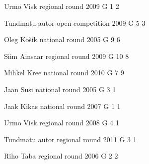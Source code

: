 \documentclass[11pt]{article}
\begin{document}
\ylDisplay{} %
{Urmo Visk} %
{regional round} %
{2009} %
{G 1} %
{2} %
{

\ifEngSolution
\fi
}

\ylDisplay{} %
{Tundmatu autor} %
{open competition} %
{2009} %
{G 5} %
{3} %
{

\ifEngSolution
\fi
}

\ylDisplay{} %
{Oleg Košik} %
{national round} %
{2005} %
{G 9} %
{6} %
{

\ifEngSolution
\fi
}

\ylDisplay{} %
{Siim Ainsaar} %
{regional round} %
{2009} %
{G 10} %
{8} %
{

\ifEngSolution
\fi
}

\ylDisplay{} %
{Mihkel Kree} %
{national round} %
{2010} %
{G 7} %
{9} %
{

\ifEngSolution
\fi
}

\ylDisplay{} %
{Jaan Susi} %
{national round} %
{2005} %
{G 3} %
{1} %
{

\ifEngSolution
\fi
}

\ylDisplay{} %
{Jaak Kikas} %
{national round} %
{2007} %
{G 1} %
{1} %
{

\ifEngSolution
\fi
}

\ylDisplay{} %
{Urmo Visk} %
{regional round} %
{2008} %
{G 4} %
{1} %
{

\ifEngSolution
\fi
}

\ylDisplay{} %
{Tundmatu autor} %
{regional round} %
{2011} %
{G 3} %
{1} %
{

\ifEngSolution
\fi
}

\ylDisplay{} %
{Riho Taba} %
{regional round} %
{2006} %
{G 2} %
{2} %
{

\ifEngSolution
\fi
}
\end{document}
